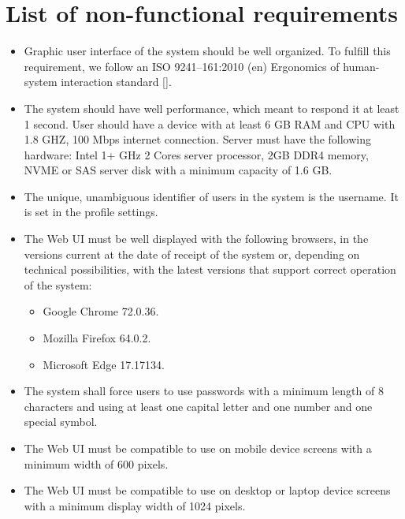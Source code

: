\chapter{List of non-functional requirements}\label{ch:list-of-non-functional-requirements}
\begin{itemize}
    \item Graphic user interface of the system should be well organized.
    To fulfill this requirement, we follow an ISO 9241--161:2010 (en) Ergonomics of human-system interaction
    standard [\cite{iso2010ergonomics}].
    \item The system should have well performance, which meant to respond it at least 1 second.
    User should have a device with at least 6 GB RAM and CPU with 1.8 GHZ, 100 Mbps internet connection.
    Server must have the following hardware: Intel 1+ GHz 2 Cores server processor, 2GB DDR4 memory, NVME or SAS
    server disk with a minimum capacity of 1.6 GB\@.
    \item The unique, unambiguous identifier of users in the system is the username.
    It is set in the profile settings.
    \item The Web UI must be well displayed with the following browsers, in the versions
    current at the date of receipt of the system or, depending on technical possibilities,
    with the latest versions that support correct operation of the system:
    \begin{itemize}
        \item Google Chrome 72.0.36.
        \item Mozilla Firefox 64.0.2.
        \item Microsoft Edge 17.17134.
    \end{itemize}
    \item The system shall force users to use passwords with a minimum length of 8
    characters and using at least one capital letter and one number and one special symbol.
    \item The Web UI must be compatible to use on mobile device screens with a minimum
    width of 600 pixels.
    \item The Web UI must be compatible to use on desktop or laptop device screens with a
    minimum display width of 1024 pixels.
\end{itemize}
